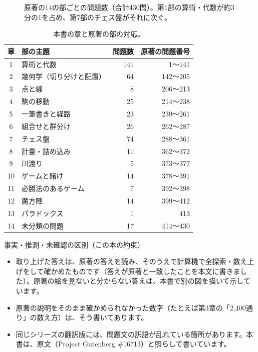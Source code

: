 \documentclass[a4paper,11pt,openany]{ltjsbook}
\begin{document}
\begin{figure}[htbp]
\centering
{}
\caption{原著の14の部ごとの問題数（合計430問）。第1部の算術・代数が約3分の1を占め、第7部のチェス盤がそれに次ぐ。}
\end{figure}

\begin{table}[htbp]
\centering
\begin{tabular}{clrr}
\toprule
章 & 部の主題 & 問題数 & 原著の問題番号\\
\midrule
1 & 算術と代数 & 141 & 1〜141\\
2 & 幾何学（切り分けと配置） & 64 & 142〜205\\
3 & 点と線 & 8 & 206〜213\\
4 & 駒の移動 & 25 & 214〜238\\
5 & 一筆書きと経路 & 23 & 239〜261\\
6 & 組合せと群分け & 26 & 262〜287\\
7 & チェス盤 & 74 & 288〜361\\
8 & 計量・詰め込み & 11 & 362〜372\\
9 & 川渡り & 5 & 373〜377\\
10 & ゲームと賭け & 14 & 378〜391\\
11 & 必勝法のあるゲーム & 7 & 392〜398\\
12 & 魔方陣 & 14 & 399〜412\\
13 & パラドックス & 1 & 413\\
14 & 未分類の問題 & 17 & 414〜430\\
\bottomrule
\end{tabular}
\caption{本書の章と原著の部の対応。}
\end{table}

\begin{notebox}{事実・推測・未確認の区別（この本の約束）}
\begin{itemize}[leftmargin=*]
\item 取り上げた答えは、原著の答えを読み、そのうえで計算機で全探索・数え上げをして確かめたものです（答えが原著と一致したことを本文に書きました）。原著の絵を見ないと分からない答えは、本書で別の図を描いて示しています。
\item 原著の説明をそのまま確かめられなかった数字（たとえば第3章の「2,400通り」の数え方）は、そう書いてあります。
\item 同じシリーズの翻訳版には、問題文の訳語が乱れている箇所があります。本書は、原文（Project Gutenberg \#16713）と照らして書いています。
\end{itemize}
\end{notebox}
\end{document}
